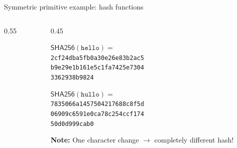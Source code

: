 \documentclass[aspectratio=169, lualatex, handout]{beamer}
\begin{document}
	\begin{frame}{Symmetric primitive example: hash functions}
		\begin{columns}[c]
			\begin{column}{0.55\textwidth}
			\end{column}
			\begin{column}{0.45\textwidth}
				\begin{tcolorbox}
					[colback=black!5!white,colframe=ciphergray] $\mathsf{SHA256}(\texttt{hello}) =$ \\ \texttt{2cf24dba5fb0a30e26e83b2ac5}\\ \texttt{b9e29e1b161e5c1fa7425e7304}\\
					\texttt{3362938b9824}

					$\mathsf{SHA256}(\texttt{hullo}) =$ \\ \texttt{7835066a1457504217688c8f5d}\\
					\texttt{06909c6591e0ca78c254ccf174}\\ \texttt{50d0d999cab0}
				\end{tcolorbox}
				\textcolor{cipherprimary}{\textbf{Note:} \small One character change $\rightarrow$
				completely different hash!}
			\end{column}
		\end{columns}
	\end{frame}
\end{document}
